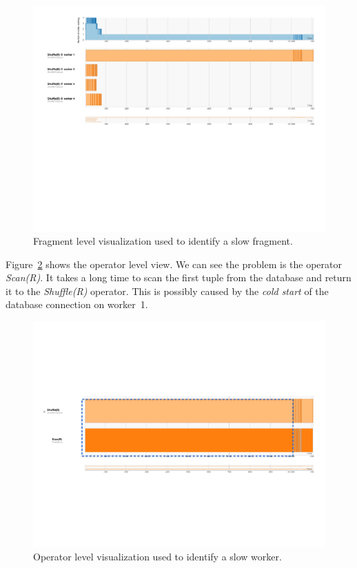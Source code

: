 \documentclass[11pt]{scrartcl}
\begin{document}
\begin{figure}[h]
  \begin{center}
    \includegraphics[width=\textwidth]{slow_worker_fragment.pdf}
  \end{center}
  \caption{Fragment level visualization used to identify a slow fragment.}
  \label{fig:slow_worker_fragment}
\end{figure}

Figure~\ref{fig:slow_worker_operator} shows the operator level view. We can see the problem is the operator \emph{Scan(R)}. It takes a long time to scan the first tuple from the database and return it to the \emph{Shuffle(R)} operator. This is possibly caused by the \emph{cold start} of the database connection on worker~1.

\begin{figure}[h]
  \begin{center}
    \includegraphics[width=\textwidth]{slow_worker_operator.pdf}
  \end{center}
  \caption{Operator level visualization used to identify a slow worker.}
  \label{fig:slow_worker_operator}
\end{figure}
\end{document}
